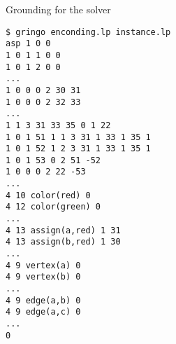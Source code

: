 \begin{frame}[fragile]{Grounding for the solver}
\begin{adjustbox}{max totalsize={\textwidth}{.83\textheight},keepaspectratio}
\begin{lstlisting}
$ gringo enconding.lp instance.lp
asp 1 0 0
1 0 1 1 0 0
1 0 1 2 0 0
...
1 0 0 0 2 30 31
1 0 0 0 2 32 33
...
1 1 3 31 33 35 0 1 22
1 0 1 51 1 1 3 31 1 33 1 35 1
1 0 1 52 1 2 3 31 1 33 1 35 1
1 0 1 53 0 2 51 -52
1 0 0 0 2 22 -53
...
4 10 color(red) 0
4 12 color(green) 0
...
4 13 assign(a,red) 1 31
4 13 assign(b,red) 1 30
...
4 9 vertex(a) 0
4 9 vertex(b) 0
...
4 9 edge(a,b) 0
4 9 edge(a,c) 0
...
0
\end{lstlisting}
\end{adjustbox}
\end{frame}
